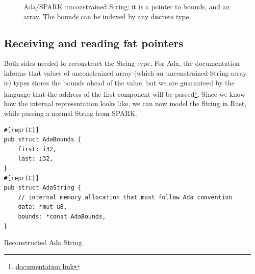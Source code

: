 \documentclass[nomenclature, english, bibtex]{kththesis}
\begin{document}
\begin{figure}[ht!]
    \centering
  \caption[Ada/SPARK unconstrained String]{Ada/SPARK unconstrained String: it is a pointer to bounds, and an array. The bounds can be indexed by any discrete type.}
  \label{fig:sparkstring}
\end{figure}


\subsection{Receiving and reading fat pointers}

Both sides needed to reconstruct the String type. For Ada, the documentation informs that values of unconstrained array (which an unconstrained String array is) types stores the bounds ahead of the value, but we are guaranteed by the language that the address of the first component will be passed{\footnote{\href{https://learn.adacore.com/courses/intro-to-embedded-sys-prog/chapters/multi_language_development.html}{documentation link}}}. Since we know how the internal representation looks like, we can now model the String in Rust, while passing a normal String from SPARK.

\begin{listing}[!ht]
\begin{verbatim}
#[repr(C)]
pub struct AdaBounds {
    first: i32,
    last: i32,
}
#[repr(C)]
pub struct AdaString {
    // internal memory allocation that must follow Ada convention
    data: *mut u8,
    bounds: *const AdaBounds,
}
\end{verbatim}
\caption[Reconstructed Ada String]{Reconstructed Ada String}
\label{lst:reconstructed_ada_string}
\end{listing}
\end{document}
